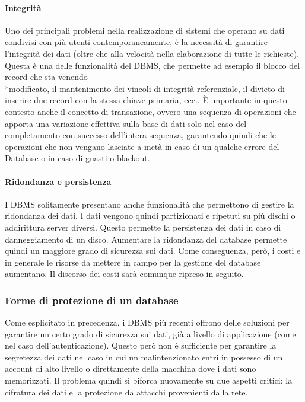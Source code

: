 \documentclass[12pt]{article}
\begin{document}
\paragraph{Integrità}
Uno dei principali problemi nella realizzazione di sistemi che operano su dati condivisi con più utenti contemporaneamente, è la necessità di garantire l’integrità dei dati (oltre che alla velocità nella elaborazione di tutte le richieste). 
Questa è una delle funzionalità del DBMS, che permette ad esempio il blocco del record che sta venendo \\*modificato, il mantenimento dei vincoli di integrità referenziale, il divieto di inserire due record con la stessa chiave primaria, ecc..
È importante in questo contesto anche il concetto di transazione, ovvero una sequenza di operazioni che apporta una variazione effettiva sulla base di dati solo nel caso del completamento con successo dell’intera sequenza, garantendo quindi che le operazioni che non vengano lasciate a metà in caso di un qualche errore del Database o in caso di guasti o blackout.

\bigskip
\paragraph{Ridondanza e persistenza}
I DBMS solitamente presentano anche funzionalità che permettono di gestire la ridondanza dei dati. I dati vengono quindi partizionati e ripetuti su più dischi o addirittura server diversi.
Questo permette la persistenza dei dati in caso di danneggiamento di un disco.
Aumentare la ridondanza del database permette quindi un maggiore grado di sicurezza sui dati. Come conseguenza, però, i costi e in generale le risorse da mettere in campo per la gestione del database aumentano. Il discorso dei costi sarà comunque ripreso in seguito.

\bigskip
\subsubsection{Forme di protezione di un database}
Come esplicitato in precedenza, i DBMS più recenti offrono delle soluzioni per garantire un certo grado di sicurezza sui dati, già a livello di applicazione (come nel caso dell’autenticazione).
Questo però non è sufficiente per garantire la segretezza dei dati nel caso in cui un malintenzionato entri in possesso di un account di alto livello o direttamente della macchina dove i dati sono memorizzati.
Il problema quindi si biforca nuovamente su due aspetti critici: la cifratura dei dati e la protezione da attacchi provenienti dalla rete.
\end{document}
